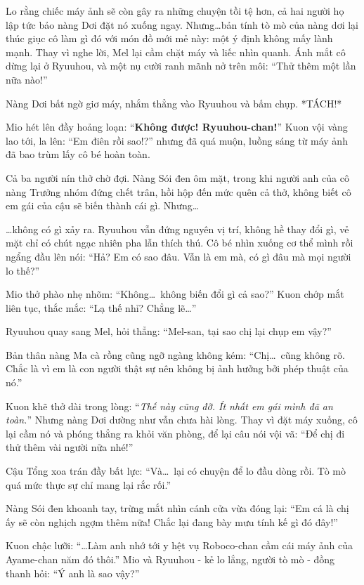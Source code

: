 \documentclass[../main.tex]{subfiles}
\begin{document}
Lo rằng chiếc máy ảnh sẽ còn gây ra những chuyện tồi tệ hơn, cả hai người họ lập tức bảo nàng Dơi đặt nó xuống ngay. Nhưng\dots bản tính tò mò của nàng dơi lại thúc giục cô làm gì đó với món đồ mới mẻ này: một ý định không mấy lành mạnh. Thay vì nghe lời, Mel lại cầm chặt máy và liếc nhìn quanh. Ánh mắt cô dừng lại ở Ryuuhou, và một nụ cười ranh mãnh nở trên môi: ``Thử thêm một lần nữa nào!''

Nàng Dơi bất ngờ giơ máy, nhắm thẳng vào Ryuuhou và bấm chụp. *TÁCH!*

Mio hét lên đầy hoảng loạn: ``\textbf{Không được! Ryuuhou-chan!}'' Kuon vội vàng lao tới, la lên: ``Em điên rồi sao!?'' nhưng đã quá muộn, luồng sáng từ máy ảnh đã bao trùm lấy cô bé hoàn toàn.

Cả ba người nín thở chờ đợi. Nàng Sói đen ôm mặt, trong khi người anh của cô nàng Trưởng nhóm đứng chết trân, hồi hộp đến mức quên cả thở, không biết cô em gái của cậu sẽ biến thành cái gì. Nhưng\dots

\dots không có gì xảy ra. Ryuuhou vẫn đứng nguyên vị trí, không hề thay đổi gì, vẻ mặt chỉ có chút ngạc nhiên pha lẫn thích thú. Cô bé nhìn xuống cơ thể mình rồi ngẩng đầu lên nói: ``Hả? Em có sao đâu. Vẫn là em mà, có gì đâu mà mọi người lo thế?''

Mio thở phào nhẹ nhõm: ``Không\dots\ không biến đổi gì cả sao?'' Kuon chớp mắt liên tục, thắc mắc: ``Lạ thế nhỉ? Chẳng lẽ\dots''

Ryuuhou quay sang Mel, hỏi thẳng: ``Mel-san, tại sao chị lại chụp em vậy?''

Bản thân nàng Ma cà rồng cũng ngỡ ngàng không kém: ``Chị\dots\ cũng không rõ. Chắc là vì em là con người thật sự nên không bị ảnh hưởng bởi phép thuật của nó.''

Kuon khẽ thở dài trong lòng: ``\textit{Thế này cũng đỡ. Ít nhất em gái mình đã an toàn.}'' Nhưng nàng Dơi dường như vẫn chưa hài lòng. Thay vì đặt máy xuống, cô lại cầm nó và phóng thẳng ra khỏi văn phòng, để lại câu nói vội vã: ``Để chị đi thử thêm vài người nữa nhé!''

Cậu Tổng xoa trán đầy bất lực: ``Và\dots\ lại có chuyện để lo đầu dòng rồi. Tò mò quá mức thực sự chỉ mang lại rắc rối.''

Nàng Sói đen khoanh tay, trừng mắt nhìn cánh cửa vừa đóng lại: ``Em cá là chị ấy sẽ còn nghịch ngợm thêm nữa! Chắc lại đang bày mưu tính kế gì đó đây!''

Kuon chậc lưỡi: ``\dots Làm anh nhớ tới y hệt vụ Roboco-chan cầm cái máy ảnh của Ayame-chan năm đó thôi.'' Mio và Ryuuhou - kẻ lo lắng, người tò mò - đồng thanh hỏi: ``Ý anh là sao vậy?''
\end{document}
